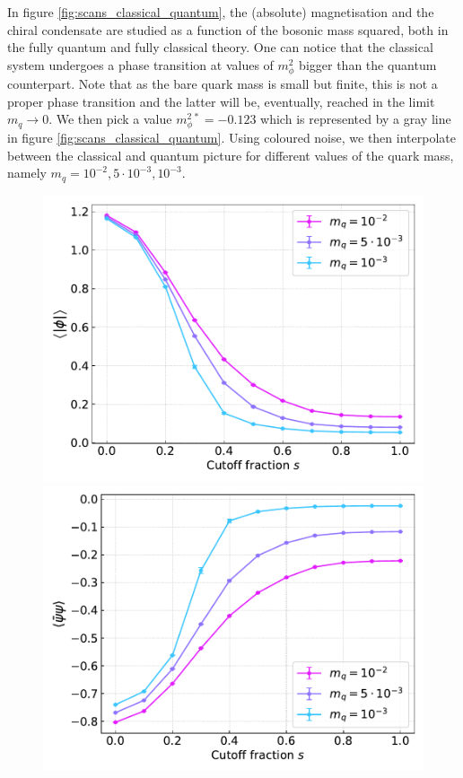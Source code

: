 In figure \ref{fig:scans_classical_quantum}, the (absolute) magnetisation and the chiral condensate are studied as a function of the bosonic mass squared, both in the fully quantum and fully classical theory. One can notice that the classical system undergoes a phase transition at values of $m_\phi^2$ bigger than the quantum counterpart. Note that as the bare quark mass is small but finite, this is not a proper phase transition and the latter will be, eventually, reached in the limit $m_q \to 0$. We then pick a value $m_\phi^{2 \, *} = -0.123$ which is represented by a gray line in figure \ref{fig:scans_classical_quantum}.
Using coloured noise, we then interpolate between the classical and quantum picture for different values of the quark mass, namely $m_q = 10^{-2}, 5 \cdot 10^{-3}, 10^{-3}$.
\begin{figure}[h!]
\centering
\begin{minipage}{0.45\textwidth}	
	\includegraphics[scale=0.48]{figures/chiral_PT/magnetisation.pdf}
\end{minipage}
\hfill
\begin{minipage}{0.45\textwidth}	
	\includegraphics[scale=0.48]{figures/chiral_PT/condensate.pdf}

\end{minipage}
\end{figure}
